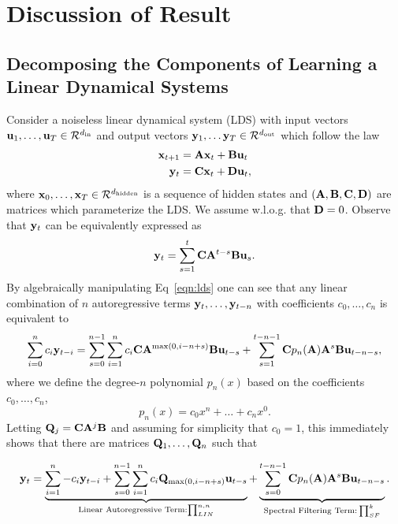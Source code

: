 

\section{Discussion of Result}

\subsection{Decomposing the Components of Learning a Linear Dynamical Systems}
\label{section:lds_breakdown}
Consider a noiseless linear dynamical system (LDS) with input vectors $\mathbf u_1, \dots, \mathbf u_T \in {\mathcal R}^{d_{\textrm{in}}}$ and output vectors $\mathbf{y}_1, \dots \mathbf{y}_T \in {\mathcal R}^{d_{\textrm{out}}}$ which follow the law 
\begin{align*}
    \mathbf{x}_{t+1} & = \mathbf{A} \mathbf{x}_t + \mathbf{B} \mathbf u_t \\
    \mathbf{y}_t & = \mathbf{C} \mathbf{x}_t + \mathbf{D} \mathbf u_t,
\end{align*}
where $\mathbf{x}_0, \dots, \mathbf{x}_T \in {\mathcal R}^{d_{\textrm{hidden}}}$ is a sequence of hidden states and $(\mathbf{A}, \mathbf{B}, \mathbf{C}, \mathbf{D})$ are matrices which parameterize the LDS. We assume w.l.o.g. that $\mathbf{D} = 0$. Observe that $\mathbf{y}_t$ can be equivalently expressed as
\begin{equation}
\label{eqn:lds}
    \mathbf{y}_t = \sum_{s = 1}^{t} \mathbf{C} \mathbf{A}^{t-s} \mathbf{B} \mathbf u_{s}.
\end{equation}
By algebraically manipulating Eq~\eqref{eqn:lds} one can see that any linear combination of $n$ autoregressive terms $\mathbf{y}_t, \dots, \mathbf{y}_{t-n}$ with coefficients $c_0, \dots, c_n$ is equivalent to 
\begin{equation}
\label{eqn:polynomial_translation}
    \sum_{i = 0}^n c_i \mathbf{y}_{t-i} = \sum_{s = 0}^{n-1} \sum_{i = 1}^n c_i \mathbf{C} \mathbf{A}^{\max (0, i-n+s)}\mathbf{B} \mathbf u_{t-s} + \sum_{s = 1}^{t-n-1} \mathbf{C} p_n(\mathbf{A}) \mathbf{A}^s \mathbf{B} \mathbf u_{t-n-s},
\end{equation}
where we define the degree-$n$ polynomial $p_n(x)$ based on the coefficients $c_0, \dots, c_n$,
\begin{equation*}
    p_n(x) = c_0 x^n + \dots + c_n x^0.
\end{equation*}
Letting $\mathbf{Q}_j =  \mathbf{C} \mathbf{A}^j \mathbf{B}$ and assuming for simplicity that $c_0=1$, this immediately shows that there are matrices $\mathbf{Q}_1, \dots, \mathbf{Q}_n$ such that
\begin{center}
\begin{equation}
\label{eqn:lds_breakdown}
    \mathbf{y}_t = \underbrace{\sum_{i = 1}^n -c_i \mathbf{y}_{t-i} + \sum_{s = 0}^{n-1} \sum_{i = 1}^n c_i \mathbf{Q}_{\max (0, i-n+s)} \mathbf u_{t-s} }_{\text{Linear Autoregressive Term}: \prod_{LIN}^{n,n}}+ \underbrace{\sum_{s = 0}^{t-n-1} \mathbf{C} p_n(\mathbf{A}) \mathbf{A}^s \mathbf{B} \mathbf u_{t-n-s}}_{\text{Spectral Filtering Term:} \prod_{SF}^k}.
\end{equation}
\end{center}

